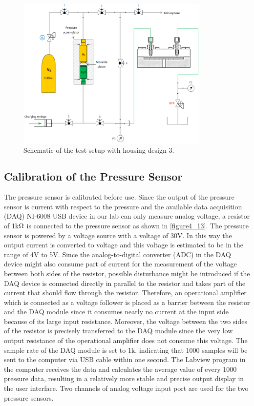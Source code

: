 \begin{figure}[h]%
\centering
\includegraphics[width=0.85\textwidth]{figures/packagingandtestunderhighpressure/figure4_12}%
\caption{Schematic of the test setup with housing design 3.}%
\label{figure4_12}%
\end{figure}

\subsection{Calibration of the Pressure Sensor}
\label{4_3_1}
The pressure sensor is calibrated before use. Since the output of the pressure sensor is current with respect to the pressure and the available data acquisition (DAQ) NI-6008 USB device in our lab can only measure analog voltage, a resistor of 1k$\ohm$ is connected to the pressure sensor as shown in \autoref{figure4_13}. The pressure sensor is powered by a voltage source with a voltage of 30V. In this way the output current is converted to voltage and this voltage is estimated to be in the range of 4V to 5V. Since the analog-to-digital converter (ADC) in the DAQ device might also consume part of current for the measurement of the voltage between both sides of the resistor, possible disturbance might be introduced if the DAQ device is connected directly in parallel to the resistor and takes part of the current that should flow through the resistor. Therefore, an operational amplifier which is connected as a voltage follower is placed as a barrier between the resistor and the DAQ module since it consumes nearly no current at the input side because of its large input resistance. Moreover, the voltage between the two sides of the resistor is precisely transferred to the DAQ module since the very low output resistance of the operational amplifier does not consume this voltage. The sample rate of the DAQ module is set to 1k, indicating that 1000 samples will be sent to the computer via USB cable within one second. The Labview program in the computer receives the data and calculates the average value of every 1000 pressure data, resulting in a relatively more stable and precise output display in the user interface. Two channels of analog voltage input port are used for the two pressure sensors. 

